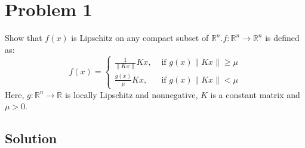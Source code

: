 \section*{Problem 1}

Show that \( f(x) \) is Lipschitz on any compact subset of \( \mathbb{R}^{n} . f: \mathbb{R}^{n} \rightarrow \mathbb{R}^{n} \) is defined as:
\begin{equation*}
    f(x)= \begin{cases}\frac{1}{\|K x\|} K x, & \text { if } g(x)\|K x\| \geq \mu \\ \frac{g(x)}{\mu} K x, & \text { if } g(x)\|K x\|<\mu\end{cases}
\end{equation*}
Here, \( g: \mathbb{R}^{n} \rightarrow \mathbb{R} \) is locally Lipschitz and nonnegative, \( K \) is a constant matrix and \( \mu>0 \).

\subsection*{Solution}

